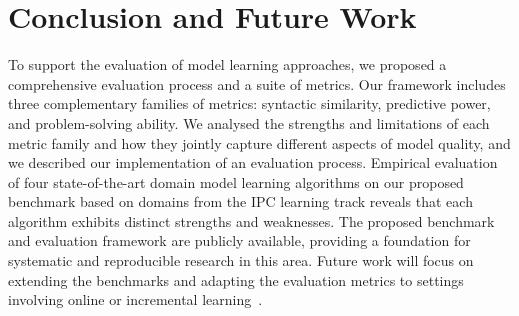 \documentclass[letterpaper]{article} %
\newif\ifaddcomments
\newcommand{\roni}[1]{\ifaddcomments{\textcolor{red}{[Roni: #1]}}\fi}
\begin{document}




\section{Conclusion and Future Work}
To support the evaluation of model learning approaches, we proposed a comprehensive evaluation process and a suite of metrics. Our framework includes three complementary families of metrics: syntactic similarity, predictive power, and problem-solving ability. We analysed the strengths and limitations of each metric family and how they jointly capture different aspects of model quality, and we described our implementation of an evaluation process. %
Empirical evaluation of four state-of-the-art domain model learning algorithms on our proposed benchmark based on domains from the IPC learning track reveals that each algorithm exhibits distinct strengths and weaknesses.
The proposed benchmark and evaluation framework are publicly available, providing a foundation for systematic and reproducible research in this area.
Future work will focus on extending the benchmarks and adapting the evaluation metrics to settings involving online or incremental learning~\citep{lamanna2021online, sreedharan2023optimistic, benyamin2025integratingreinforcementlearningaction, ng2019incremental, chitnis2021glib, jin2022creativity, verma2023autonomous, karia2023epistemic}. 
\end{document}
